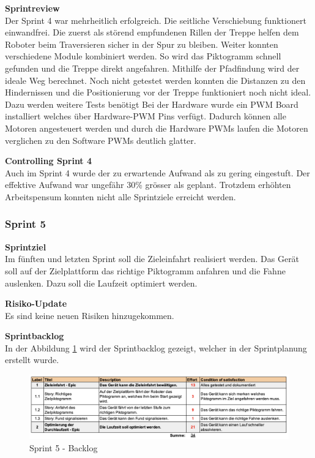 \newpage

\textbf{Sprintreview}\\
Der Sprint 4 war mehrheitlich erfolgreich. Die seitliche Verschiebung funktionert einwandfrei. Die zuerst als störend empfundenen Rillen der Treppe helfen dem Roboter beim Traversieren sicher in der Spur zu bleiben. Weiter konnten verschiedene Module kombiniert werden. So wird das Piktogramm schnell gefunden und die Treppe direkt angefahren. Mithilfe der Pfadfindung wird der ideale Weg berechnet. Noch nicht getestet werden konnten die Distanzen zu den Hindernissen und die Positionierung vor der Treppe funktioniert noch nicht ideal. Dazu werden weitere Tests benötigt
Bei der Hardware wurde ein PWM  Board installiert welches über Hardware-PWM Pins verfügt. Dadurch können alle Motoren angesteuert werden und durch die Hardware PWMs laufen die Motoren verglichen zu den Software PWMs deutlich glatter.

\textbf{Controlling Sprint 4}\\
Auch im Sprint 4 wurde der zu erwartende Aufwand als zu gering eingestuft. Der effektive Aufwand war ungefähr 30\% grösser als geplant. Trotzdem erhöhten Arbeitspensum konnten nicht alle Sprintziele erreicht werden.

\subsubsection{Sprint 5}
\textbf{Sprintziel}\\
Im fünften und letzten Sprint soll die Zieleinfahrt realisiert werden. Das Gerät soll auf der Zielplattform das richtige Piktogramm anfahren und die Fahne auslenken. Dazu soll die Laufzeit optimiert werden.

\textbf{Risiko-Update}\\
Es sind keine neuen Risiken hinzugekommen.

\textbf{Sprintbacklog}\\
In der Abbildung \ref{fig:sprint-backlog-5} wird der Sprintbacklog gezeigt, welcher in der Sprintplanung erstellt wurde.
\begin{figure}[H]
  \includegraphics[width=1.0\textwidth]{img/projektmanagement/Sprint 5.png}
  \centering
  \caption{Sprint 5 - Backlog}
  \label{fig:sprint-backlog-5}
\end{figure}

